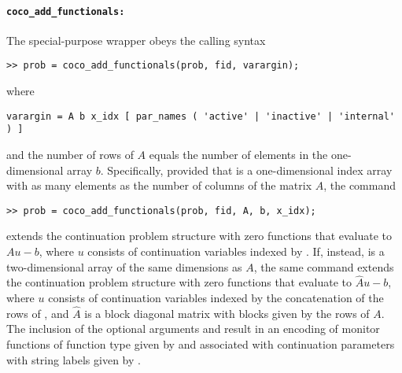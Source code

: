 \paragraph{\texttt{coco\_add\_functionals:}}
The  special-purpose wrapper obeys the calling syntax
\begin{lstlisting}[language=coco-highlight]
>> prob = coco_add_functionals(prob, fid, varargin);
\end{lstlisting}
where
\begin{lstlisting}[language=coco-highlight]
varargin = A b x_idx [ par_names ( 'active' | 'inactive' | 'internal' ) ]
\end{lstlisting}
and the number of rows of $A$ equals the number of elements in the one-dimensional array $b$. Specifically, provided that  is a one-dimensional index array with as many elements as the number of columns of the matrix $A$, the command
\begin{lstlisting}[language=coco-highlight]
>> prob = coco_add_functionals(prob, fid, A, b, x_idx);
\end{lstlisting}
extends the continuation problem structure with zero functions that evaluate to $Au-b$, where $u$ consists of continuation variables indexed by . If, instead,  is a two-dimensional array of the same dimensions as $A$, the same command extends the continuation problem structure with zero functions that evaluate to $\hat{A}u-b$, where $u$ consists of continuation variables indexed by the concatenation of the rows of , and $\hat{A}$ is a block diagonal matrix with blocks given by the rows of $A$. The inclusion of the optional arguments  and  result in an encoding of monitor functions of function type given by  and associated with continuation parameters with string labels given by .

